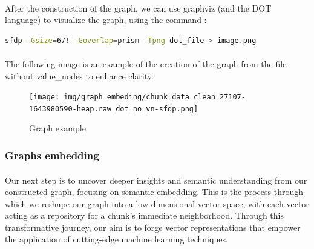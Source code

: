         \paragraph{}After the construction of the graph, we can use graphviz (and the DOT language)\cite{farin_graphviz_2004} to visualize the graph, using the command :
        \begin{lstlisting}[language=bash]
            sfdp -Gsize=67! -Goverlap=prism -Tpng dot_file > image.png
        \end{lstlisting}

        \paragraph{}The following image is an example of the creation of the graph from the file  without \glspl{value_node} to enhance clarity.
        \begin{figure}[H]
            \centering
            \texttt{[image: img/graph\_embeding/chunk\_data\_clean\_27107-1643980590-heap.raw\_dot\_no\_vn-sfdp.png]}
            \caption{Graph example}
            \label{fig:graph_embedding:graph_example}
        \end{figure}

    \subsubsection{Graphs embedding} \label{sec:embedding:first_graph}

        \paragraph{}Our next step is to uncover deeper insights and semantic understanding from our constructed graph, focusing on semantic embedding. This is the process through which we reshape our graph into a low-dimensional vector space, with each vector acting as a repository for a \gls{chunk}'s immediate neighborhood. Through this transformative journey, our aim is to forge vector representations that empower the application of cutting-edge machine learning techniques.

